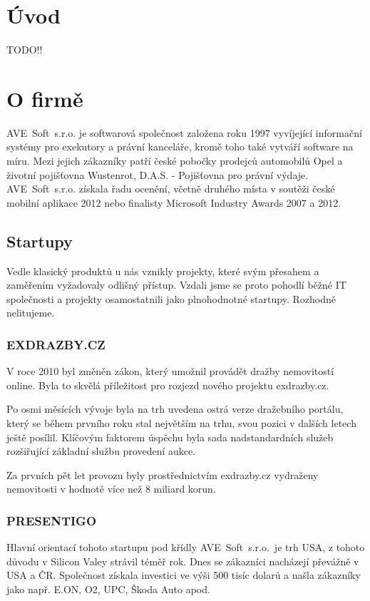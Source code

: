 \documentclass[czech,bachelor,dept460,male,csharp]{diploma}
\newcommand{\AveSoft}{AVE~Soft~s.r.o.}
\begin{document}
\MakeTitlePages

\section{Úvod}
TODO!!

\section{O firmě}
	\AveSoft\cite{avesoftL} je softwarová společnost založena roku 1997 vyvíjející informační systémy pro exekutory a právní kanceláře, kromě toho také vytváří software na míru.
	Mezi jejich zákazníky patří české pobočky prodejců automobilů Opel a životní pojišťovna Wustenrot, D.A.S. - Pojišťovna pro právní výdaje.
	\AveSoft\cite{avesoft} získala řadu ocenění, včetně druhého místa v soutěži české mobilní aplikace 2012 nebo finalisty Microsoft Industry Awards 2007 a 2012.
	\subsection{Startupy}
	Vedle klasický produktů u nás vznikly projekty, které svým přesahem a zaměřením vyžadovaly odlišný přístup. Vzdali jsme se proto pohodlí běžné IT společnosti a projekty osamostatnili jako plnohodnotné startupy. Rozhodně nelitujeme. 
 		\subsubsection{EXDRAZBY.CZ}
 		V roce 2010 byl změněn zákon, který umožnil provádět dražby nemovitostí online. Byla to skvělá příležitost pro rozjezd nového projektu exdrazby.cz.

		Po osmi měsících vývoje byla na trh uvedena ostrá verze dražebního portálu, který se během prvního roku stal největším na trhu, svou pozici v dalších letech ještě posílil. Klíčovým faktorem úspěchu byla sada nadstandardních služeb rozšiřující základní službu provedení aukce.

		Za prvních pět let provozu byly prostřednictvím exdrazby.cz vydraženy nemovitosti v hodnotě více než 8 miliard korun.
 		\subsubsection{PRESENTIGO}
 		Hlavní orientací tohoto startupu pod křídly \AveSoft\ je trh USA, z tohoto důvodu v Silicon Valey strávil téměř rok. Dnes se zákazníci nacházejí převážně v USA a ČR. Společnost získala investici ve výši 500 tisíc dolarů a našla zákazníky jako např. E.ON, O2, UPC, Škoda Auto apod.
\end{document}
